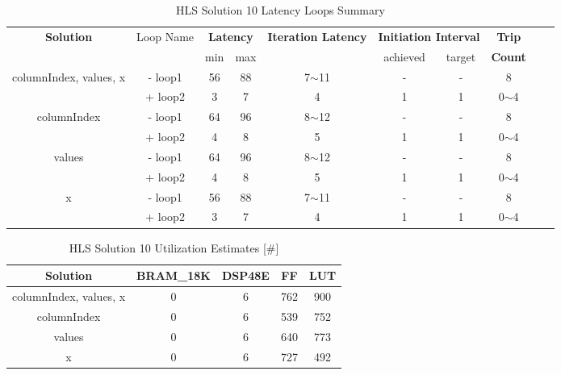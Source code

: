 \begin{table}[H]
	\centering
	\begin{tabular}{|c|c|c|c|c|c|c|c|c|c|}
		\hline
		\multicolumn{1}{|c|}{\textbf{Solution}} & \multicolumn{1}{|c|}{Loop Name} & \multicolumn{2}{|c|}{\textbf{Latency}} & \multicolumn{1}{c|}{\textbf{Iteration Latency}} & \multicolumn{2}{c|}{\textbf{Initiation Interval}} & \multicolumn{1}{c|}{\textbf{Trip}}  \\
		&  & min & max & & achieved & target & \textbf{Count} \\
		\hline
		columnIndex, values, x & - loop1 & 56 & 88 & 7$\sim$11 & - & - & 8 \\
		& + loop2 & 3 & 7 & 4 & 1 & 1 & 0$\sim$4 \\
		\hline
		columnIndex & - loop1 & 64 & 96 & 8$\sim$12 & - & - & 8 \\
		& + loop2 & 4 & 8 & 5 & 1 & 1 & 0$\sim$4 \\
		\hline
		values & - loop1 & 64 & 96 & 8$\sim$12 & - & - & 8 \\
		& + loop2 & 4 & 8 & 5 & 1 & 1 & 0$\sim$4 \\
		\hline
		x & - loop1 & 56 & 88 & 7$\sim$11 & - & - & 8 \\
		& + loop2 & 3 & 7 & 4 & 1 & 1 & 0$\sim$4 \\
		\hline
	\end{tabular}
	\caption{HLS Solution 10 Latency Loops Summary }
	\label{tab:hls-solution-10-loop-summary}
\end{table}

\begin{table}[H]
	\centering
	\begin{tabular}{|c|c|c|c|c|}
		\hline
		\textbf{Solution} & \textbf{BRAM\_18K} & \textbf{DSP48E} & \textbf{FF} & \textbf{LUT} \\
		\hline
		columnIndex, values, x & 0 & 6 & 762 & 900 \\
		\hline
		columnIndex & 0 & 6 & 539 & 752 \\
		\hline
		values & 0 & 6 & 640 & 773 \\
		\hline
		x & 0 & 6 & 727 & 492 \\
		\hline
	\end{tabular}
	\caption{HLS Solution 10 Utilization Estimates [\#]}
	\label{tab:hls-solution-10-utilization-report}
\end{table}

